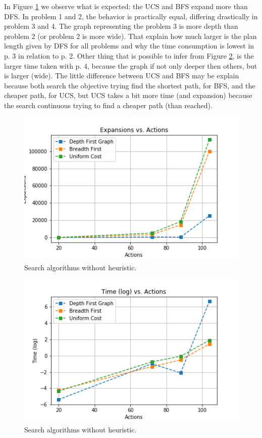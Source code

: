 \documentclass[a4paper]{article}
\begin{document}
In Figure \ref{figsm234} we observe what is expected: the UCS and BFS expand more than DFS. In problem 1 and 2, the behavior is practically equal, differing drastically in problem 3 and 4. The graph representing the problem 3 is more depth than problem 2 (or problem 2 is more wide). That explain how much larger is the plan length given by DFS for all problems and why the time consumption is lowest in p. 3 in relation to p. 2. Other thing that is possible to infer from Figure \ref{figsm231}, is the larger time taken with p. 4, because the graph if not only deeper then others, but is larger (wide). The little difference between UCS and BFS may be explain because both search the objective trying find the shortest path, for BFS, and the cheaper path, for UCS, but UCS takes a bit more time (and expansion) because the search continuous trying to find a cheaper path (than reached).

\begin{figure}[htpb]
\begin{center}
\includegraphics[width=1\columnwidth]{fig/results_sm234.png}
\end{center}
\caption{Search algorithms without heuristic.}
\label{figsm234}
\end{figure}
    
\begin{figure}[htpb]
\begin{center}
\includegraphics[width=1\columnwidth]{fig/results_sm231.png}
\end{center}
\caption{Search algorithms without heuristic.}
\label{figsm231}
\end{figure}
\end{document}
